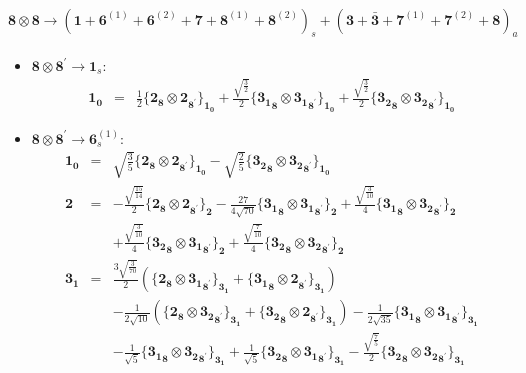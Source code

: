 \documentclass[english]{article}
\newcommand{\subcg}[3]{\big\{ {#1}\otimes{#2}\big\}^{}_{#3}}
\newcommand{\rep}[1]{\mathbf{#1}}
\begin{document}
\paragraph*{\Large $\rep{8}\otimes\rep{8}\to\left(\rep{1}+\rep{6}^{(1)}+\rep{6}^{(2)}+\rep{7}+\rep{8}^{(1)}+\rep{8}^{(2)}\right)_s+\left(\rep{3}+\rep{\bar{3}}+\rep{7}^{(1)}+\rep{7}^{(2)}+\rep{8}\right)_a$}
\begin{itemize}
\item $\rep{8}\otimes\rep{8}^{\prime}\to\rep{1}_{s}$:
\begin{eqnarray*}
\rep{1_0} &=& \frac{1}{2}\subcg{\rep{2}_{\rep{8}}}{\rep{2}_{\rep{8}^{\prime}}}{\rep{1_0}}+\frac{\sqrt{\frac{3}{2}}}{2}\subcg{\rep{3_1}_{\rep{8}}}{\rep{3_1}_{\rep{8}^{\prime}}}{\rep{1_0}}+\frac{\sqrt{\frac{3}{2}}}{2}\subcg{\rep{3_2}_{\rep{8}}}{\rep{3_2}_{\rep{8}^{\prime}}}{\rep{1_0}}
\end{eqnarray*}
\item $\rep{8}\otimes\rep{8}^{\prime}\to\rep{6}_{s}^{(1)}$:
\begin{eqnarray*}
\rep{1_0} &=& \sqrt{\frac{3}{5}}\subcg{\rep{2}_{\rep{8}}}{\rep{2}_{\rep{8}^{\prime}}}{\rep{1_0}}-\sqrt{\frac{2}{5}}\subcg{\rep{3_2}_{\rep{8}}}{\rep{3_2}_{\rep{8}^{\prime}}}{\rep{1_0}}
\\
\rep{2} &=& -\frac{\sqrt{\frac{15}{14}}}{2}\subcg{\rep{2}_{\rep{8}}}{\rep{2}_{\rep{8}^{\prime}}}{\rep{2}}-\frac{27}{4 \sqrt{70}}\subcg{\rep{3_1}_{\rep{8}}}{\rep{3_1}_{\rep{8}^{\prime}}}{\rep{2}}+\frac{\sqrt{\frac{3}{10}}}{4}\subcg{\rep{3_1}_{\rep{8}}}{\rep{3_2}_{\rep{8}^{\prime}}}{\rep{2}} \\ 
 & & +\frac{\sqrt{\frac{3}{10}}}{4}\subcg{\rep{3_2}_{\rep{8}}}{\rep{3_1}_{\rep{8}^{\prime}}}{\rep{2}}+\frac{\sqrt{\frac{7}{10}}}{4}\subcg{\rep{3_2}_{\rep{8}}}{\rep{3_2}_{\rep{8}^{\prime}}}{\rep{2}}
\\
\rep{3_1} &=& \frac{3 \sqrt{\frac{3}{70}}}{2}\left(\subcg{\rep{2}_{\rep{8}}}{\rep{3_1}_{\rep{8}^{\prime}}}{\rep{3_1}}+\subcg{\rep{3_1}_{\rep{8}}}{\rep{2}_{\rep{8}^{\prime}}}{\rep{3_1}}\right) \\ 
 & & -\frac{1}{2 \sqrt{10}}\left(\subcg{\rep{2}_{\rep{8}}}{\rep{3_2}_{\rep{8}^{\prime}}}{\rep{3_1}}+\subcg{\rep{3_2}_{\rep{8}}}{\rep{2}_{\rep{8}^{\prime}}}{\rep{3_1}}\right)-\frac{1}{2 \sqrt{35}}\subcg{\rep{3_1}_{\rep{8}}}{\rep{3_1}_{\rep{8}^{\prime}}}{\rep{3_1}} \\ 
 & & -\frac{1}{\sqrt{5}}\subcg{\rep{3_1}_{\rep{8}}}{\rep{3_2}_{\rep{8}^{\prime}}}{\rep{3_1}}+\frac{1}{\sqrt{5}}\subcg{\rep{3_2}_{\rep{8}}}{\rep{3_1}_{\rep{8}^{\prime}}}{\rep{3_1}}-\frac{\sqrt{\frac{7}{5}}}{2}\subcg{\rep{3_2}_{\rep{8}}}{\rep{3_2}_{\rep{8}^{\prime}}}{\rep{3_1}}

\end{eqnarray*}
\end{itemize}
\end{document}
